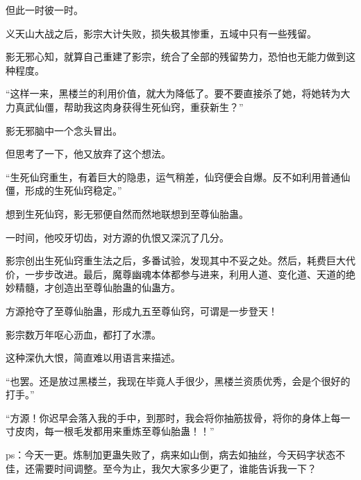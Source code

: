 \begin{this_body}
但此一时彼一时。

义天山大战之后，影宗大计失败，损失极其惨重，五域中只有一些残留。

影无邪心知，就算自己重建了影宗，统合了全部的残留势力，恐怕也无能力做到这种程度。

“这样一来，黑楼兰的利用价值，就大为降低了。要不要直接杀了她，将她转为大力真武仙僵，帮助我这肉身获得生死仙窍，重获新生？”

影无邪脑中一个念头冒出。

但思考了一下，他又放弃了这个想法。

“生死仙窍重生，有着巨大的隐患，运气稍差，仙窍便会自爆。反不如利用普通仙僵，形成的生死仙窍稳定。”

想到生死仙窍，影无邪便自然而然地联想到至尊仙胎蛊。

一时间，他咬牙切齿，对方源的仇恨又深沉了几分。

影宗创出生死仙窍重生法之后，多番试验，发现其中不妥之处。然后，耗费巨大代价，一步步改进。最后，魔尊幽魂本体都参与进来，利用人道、变化道、天道的绝妙精髓，才创造出至尊仙胎蛊的仙蛊方。

方源抢夺了至尊仙胎蛊，形成九五至尊仙窍，可谓是一步登天！

影宗数万年呕心沥血，都打了水漂。

这种深仇大恨，简直难以用语言来描述。

“也罢。还是放过黑楼兰，我现在毕竟人手很少，黑楼兰资质优秀，会是个很好的打手。”

“方源！你迟早会落入我的手中，到那时，我会将你抽筋拔骨，将你的身体上每一寸皮肉，每一根毛发都用来重炼至尊仙胎蛊！！”

ps：今天一更。炼制加更蛊失败了，病来如山倒，病去如抽丝，今天码字状态不佳，还需要时间调整。至今为止，我欠大家多少更了，谁能告诉我一下？

\end{this_body}

